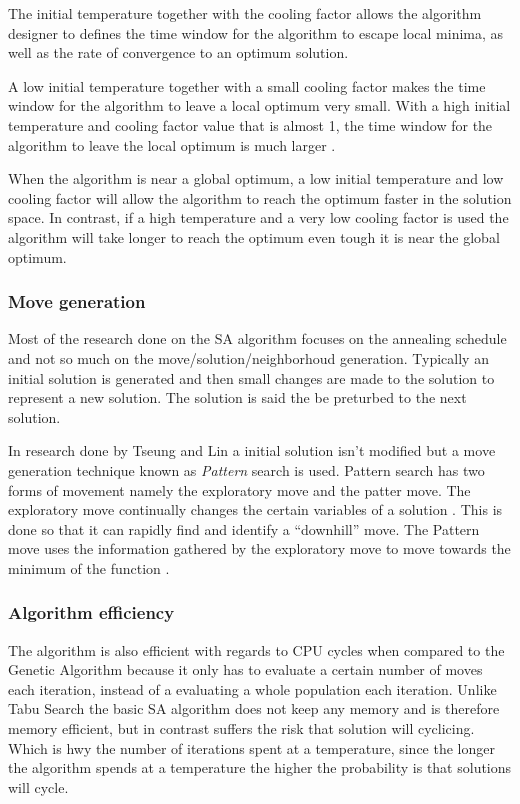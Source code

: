 The initial temperature together with the cooling factor allows the algorithm designer to defines the time window for the algorithm to escape local minima, as well as the rate of convergence to an optimum solution\cite{SALongestCommon,VariousCoolingSA}.

A low initial temperature together with a small cooling factor makes the time window for the algorithm to leave a local optimum very small\cite{SALongestCommon}. With a high initial temperature and cooling factor value that is almost 1, the time window for the algorithm to leave the local optimum is much larger \cite{SALongestCommon}. 

When the algorithm is near a global optimum, a low initial temperature and low cooling factor will allow the algorithm to reach the optimum faster in the solution space. In contrast, if a high temperature and a very low cooling factor is used the algorithm will take longer to reach the optimum even tough it is near the global optimum\cite{SALongestCommon}.

\subsubsection{Move generation}
Most of the research done on the SA algorithm focuses on the annealing schedule and not so much on the move/solution/neighborhoud generation. Typically an initial solution is generated and then small changes are made to the solution to represent a new solution. The solution is said the be preturbed to the next solution. 

In research done by Tseung and Lin \cite{CurveFittingSA} a initial solution isn't modified but a move generation technique known as \emph{Pattern} search is used. Pattern search has two forms of movement namely the exploratory move and the patter move. The exploratory move continually changes the certain variables of a solution \cite{CurveFittingSA}. This is done so that it can rapidly find and identify a ``downhill'' move. The Pattern move uses the information gathered by the exploratory move to move towards the minimum of the function \cite{CurveFittingSA}.
\subsubsection{Algorithm efficiency}
The algorithm is also efficient with regards to CPU cycles when compared to the Genetic Algorithm because it only has to evaluate a certain number of moves each iteration, instead of a evaluating a whole population each iteration. Unlike Tabu Search the basic SA algorithm does not keep any memory and is therefore memory efficient, but in contrast suffers the risk that solution will cyclicing. Which is hwy the number of iterations spent at a temperature, since the longer the algorithm spends at a temperature the higher the probability is that solutions will cycle.
